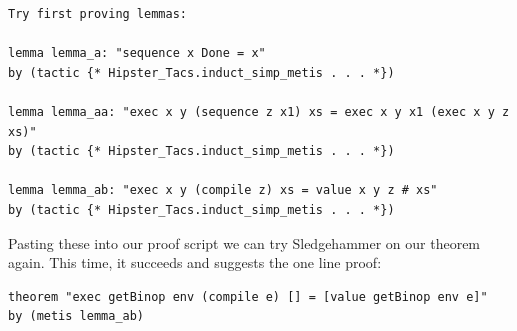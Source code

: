 \begin{small}
\begin{verbatim}
Try first proving lemmas:

lemma lemma_a: "sequence x Done = x"
by (tactic {* Hipster_Tacs.induct_simp_metis . . . *})

lemma lemma_aa: "exec x y (sequence z x1) xs = exec x y x1 (exec x y z xs)"
by (tactic {* Hipster_Tacs.induct_simp_metis . . . *})

lemma lemma_ab: "exec x y (compile z) xs = value x y z # xs"
by (tactic {* Hipster_Tacs.induct_simp_metis . . . *})
\end{verbatim}
\end{small}
Pasting these into our proof script we can try Sledgehammer on our theorem again. This time, it succeeds and suggests the one line proof:%
\begin{verbatim}
theorem "exec getBinop env (compile e) [] = [value getBinop env e]"
by (metis lemma_ab)
\end{verbatim}

